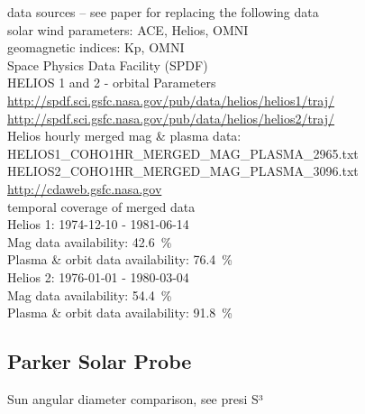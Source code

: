 


data sources -- see paper for replacing the following data\\
solar wind parameters: ACE, Helios, OMNI\\
geomagnetic indices: Kp, OMNI\\

Space Physics Data Facility (SPDF)\\

HELIOS 1 and 2 - orbital Parameters\\
\url{http://spdf.sci.gsfc.nasa.gov/pub/data/helios/helios1/traj/}\\
\url{http://spdf.sci.gsfc.nasa.gov/pub/data/helios/helios2/traj/}\\

Helios hourly merged mag \& plasma data:\\
HELIOS1\_COHO1HR\_MERGED\_MAG\_PLASMA\_2965.txt\\
HELIOS2\_COHO1HR\_MERGED\_MAG\_PLASMA\_3096.txt\\
\url{http://cdaweb.gsfc.nasa.gov}\\
temporal coverage of merged data\\
Helios 1: 1974-12-10 - 1981-06-14\\
Mag data availability: 42.6~\%\\
Plasma \& orbit data availability: 76.4~\%\\
Helios 2: 1976-01-01 - 1980-03-04\\
Mag data availability: 54.4~\%\\
Plasma \& orbit data availability: 91.8~\%\\


\subsection{Parker Solar Probe}
\label{sec:parker_solar_probe}

Sun angular diameter comparison, see presi S³\\
